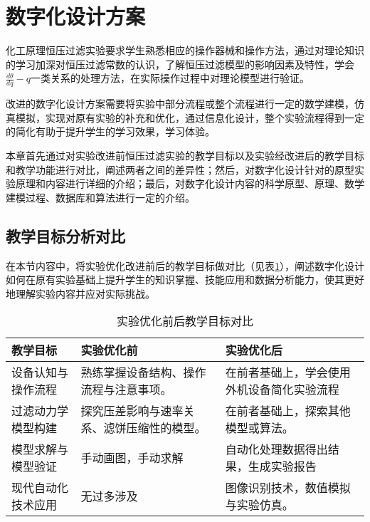 \section{数字化设计方案}


化工原理恒压过滤实验要求学生熟悉相应的操作器械和操作方法，通过对理论知识的学习加深对恒压过滤常数\textsuperscript{\cite{ref4,ref5}}的认识，了解恒压过滤模型的影响因素及特性，学会$\frac{d \theta}{d q} - q$一类关系的处理方法，在实际操作过程中对理论模型进行验证。

改进的数字化设计方案需要将实验中部分流程或整个流程进行一定的数学建模，仿真模拟，实现对原有实验的补充和优化，通过信息化设计，整个实验流程得到一定的简化有助于提升学生的学习效果，学习体验。

本章首先通过对实验改进前恒压过滤实验的教学目标以及实验经改进后的教学目标和教学功能进行对比，阐述两者之间的差异性；然后，对数字化设计针对的原型实验原理和内容进行详细的介绍；最后，对数字化设计内容的科学原型、原理、数学建模过程、数据库和算法进行一定的介绍。

\subsection{教学目标分析对比}


在本节内容中，将实验优化改进前后的教学目标做对比（见表\ref{tab:vs1}），阐述数字化设计如何在原有实验基础上提升学生的知识掌握、技能应用和数据分析能力，使其更好地理解实验内容并应对实际挑战。

\begin{table}[H]
    \centering
    \caption{实验优化前后教学目标对比}  
    \settableinnerfont
    \label{tab:vs1}
    \begin{tabular}{lll}
        \toprule
        \textbf{教学目标} & \textbf{实验优化前} & \textbf{实验优化后} \\
        \midrule
        设备认知与操作流程 & 熟练掌握设备结构、操作流程与注意事项。 & 在前者基础上，学会使用外机设备简化实验流程 \\
        过滤动力学模型构建 & 探究压差影响与速率关系、滤饼压缩性的模型。 & 在前者基础上，探索其他模型或算法。 \\
        模型求解与模型验证 & 手动画图，手动求解 & 自动化处理数据得出结果，生成实验报告 \\
        现代自动化技术应用 & 无过多涉及 & 图像识别技术，数值模拟与实验仿真。 \\
        \bottomrule
    \end{tabular}
\end{table}

